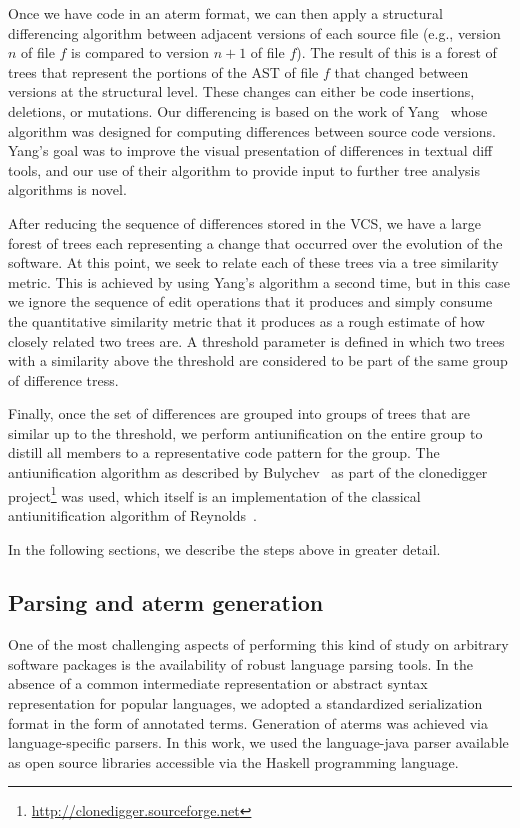 Once we have code in an aterm format, we can then apply a structural
differencing algorithm between adjacent versions of each source file (e.g.,
version $n$ of file $f$ is compared to version $n+1$ of file $f$).  The result
of this is a forest of trees that represent the portions of the AST of file
$f$ that changed between versions at the structural level.  These changes can
either be code insertions, deletions, or mutations.  Our differencing is based
on the work of Yang~\cite{yang91diff} whose algorithm was designed for
computing differences between source code versions.  Yang's goal was to
improve the visual presentation of differences in textual diff tools, and our
use of their algorithm to provide input to further tree analysis algorithms is
novel.

After reducing the sequence of differences stored in the VCS, we have a large
forest of trees each representing a change that occurred over the evolution of
the software.  At this point, we seek to relate each of these trees via a
tree similarity metric.  This is achieved by using Yang's algorithm a second
time, but in this case we ignore the sequence of edit operations that it
produces and simply consume the quantitative similarity metric that it
produces as a rough estimate of how closely related two trees are.  A
threshold parameter is defined in which two trees with a similarity above the
threshold are considered to be part of the same group of difference tress.

Finally, once the set of differences are grouped into groups of trees that are
similar up to the threshold, we perform antiunification on the entire group to
distill all members to a representative code pattern for the group.  The
antiunification algorithm as described by Bulychev~\cite{bulychev08dupe} as
part of the clonedigger
project\footnote{\url{http://clonedigger.sourceforge.net}} was used, which
itself is an implementation of the classical antiunitification algorithm of
Reynolds~\cite{reynolds69antiunification}.

In the following sections, we describe the steps above in greater detail.

\subsection{Parsing and aterm generation}

One of the most challenging aspects of performing this kind of study on
arbitrary software packages is the availability of robust language parsing
tools.  In the absence of a common intermediate representation or abstract
syntax representation for popular languages, we adopted a standardized
serialization format in the form of annotated terms.  Generation of aterms was
achieved via language-specific parsers.  In this work, we used the
language-java parser available as open source libraries accessible via the
Haskell programming language.

